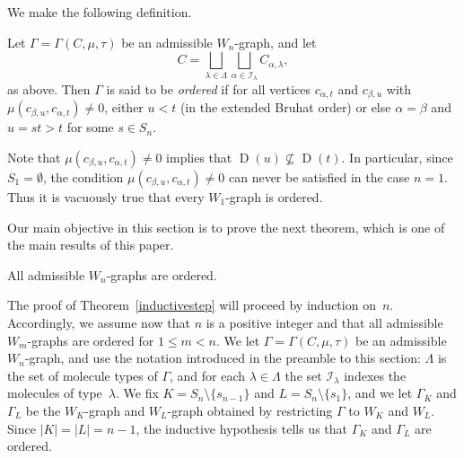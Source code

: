 \documentclass[ALCO,ThmDefs,Unicode,epreuves]{cedram}
\DeclareMathOperator{\D}{D}
\begin{document}
We make the following definition.
\begin{defi}\label{orderedWgraphdef}
Let $\Gamma=\Gamma(C,\mu,\tau)$ be an admissible $W_n$-graph, and let
\begin{equation*}
C=\bigsqcup_{\lambda\in\Lambda}\bigsqcup_{\alpha\in\mathcal{I}_{\lambda}}C_{\alpha,\lambda},
\end{equation*}
as above. Then $\Gamma$ is said to be \emph{ordered}
if for all vertices $c_{\alpha,t}$ and $c_{\beta,u}$ with
$\mu(c_{\beta,u},c_{\alpha,t})\neq 0$, either $u<t$ (in the extended
Bruhat order) or else $\alpha=\beta$ and $u=st>t$ for some $s\in S_n$.
\end{defi}

Note that $\mu(c_{\beta,u},c_{\alpha,t})\neq 0$
implies that $\D(u)\nsubseteq\D(t)$. In particular, since $S_1=\emptyset$,
the condition $\mu(c_{\beta,u},c_{\alpha,t})\neq 0$ can never be satisfied
in the case $n=1$. Thus it is vacuously true that every $W_1$-graph is ordered.

Our main objective in this section is to prove the next theorem, which is
one of the main results of this paper.

\begin{theo}\label{inductivestep}
All admissible $W_n$-graphs are ordered.
\end{theo}

The proof of Theorem~\ref{inductivestep} will proceed by induction on~$n$.
Accordingly, we assume now that $n$ is a positive integer and that all admissible
$W_m$-graphs are ordered for $1\leqslant m<n$.
We let $\Gamma=\Gamma(C,\mu,\tau)$ be an admissible $W_n$-graph, and use the
notation introduced in the preamble to this section: $\Lambda$ is the set of molecule
types of $\Gamma$, and for each $\lambda\in\Lambda$ the set $\mathcal{I}_\lambda$
indexes the molecules of type~$\lambda$. We fix $K=S_n\setminus\{s_{n-1}\}$ and
$L=S_n\setminus\{s_1\}$, and we let $\Gamma_K$
and $\Gamma_L$ be the $W_K$-graph and $W_L$-graph obtained by restricting
$\Gamma$ to $W_K$ and $W_L$. Since $|K|=|L|=n-1$, the
inductive hypothesis tells us that $\Gamma_K$ and $\Gamma_L$ are ordered.
\end{document}
